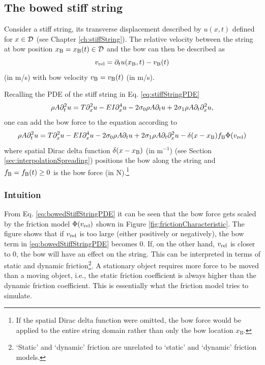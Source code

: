 \subsection{The bowed stiff string}\label{sec:bowedStiffStringStatic}
Consider a stiff string, its transverse displacement described by $u(x,t)$ defined for $x\in \mathcal{D}$ (see Chapter \ref{ch:stiffString}). The relative velocity between the string at bow position $x_{\text{B}} = x_{\text{B}}(t) \in \mathcal{D}$ and the bow can then be described as
\begin{equation}\label{eq:vrel}
    v_\text{rel} = \partial_t u(x_{\text{B}}, t) - v_{\text{B}}(t)
\end{equation}
(in m/s) with bow velocity $v_{\text{B}} = v_{\text{B}}(t)$ (in m/s).

Recalling the PDE of the stiff string in Eq. \eqref{eq:stiffStringPDE}
\begin{equation}
    \rho A \partial_t^2 u = T \partial_x^2 u - EI \partial_x^4 u - 2 \sigma_{0} \rho A \partial_t u + 2 \sigma_{1} \rho A\partial_t \partial_x^2 u,
\end{equation}
one can add the bow force to the equation according to 
\begin{equation}\label{eq:bowedStiffStringPDE}
    \rho A \partial_t^2 u = T \partial_x^2 u - EI \partial_x^4 u - 2 \sigma_{0} \rho A \partial_t u + 2 \sigma_{1} \rho A\partial_t \partial_x^2 u - \delta(x-x_{\text{B}})f_{\text{B}}\Phi(v_\text{rel})
\end{equation}
where spatial Dirac delta function $\delta(x-x_{\text{B}})$ (in m$^{-1}$) (see Section \ref{sec:interpolationSpreading}) positions the bow along the string and $f_{\text{B}} = f_{\text{B}}(t) \geq 0$ is the bow force (in N).\footnote{If the spatial Dirac delta function were omitted, the bow force would be applied to the entire string domain rather than only the bow location $x_\text{B}$.} 

\subsubsection{Intuition}
From Eq. \eqref{eq:bowedStiffStringPDE} it can be seen that the bow force gets scaled by the friction model $\Phi(v_\text{rel})$ shown in Figure \ref{fig:frictionCharacteristic}. 
The figure shows that if $v_\text{rel}$ is too large (either positively or negatively), the bow term in \eqref{eq:bowedStiffStringPDE} becomes $0$. If, on the other hand, $v_\text{rel}$ is closer to $0$, the bow will have an effect on the string. This can be interpreted in terms of static and dynamic friction\footnote{`Static' and `dynamic' friction are unrelated to `static' and `dynamic' friction models.}. A stationary object requires more force to be moved than a moving object, i.e., the static friction coefficient is always higher than the dynamic friction coefficient. This is essentially what the friction model tries to simulate.

